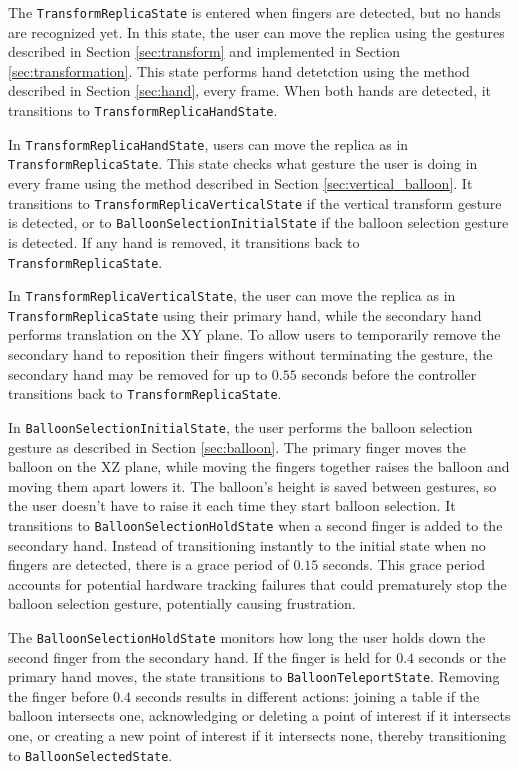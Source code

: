     The \lstinline{TransformReplicaState} is entered when fingers are detected, but no hands are recognized yet. In this state, the user can move the replica using the gestures described in Section \ref{sec:transform} and implemented in Section \ref{sec:transformation}. This state performs hand detetction using the method described in Section \ref{sec:hand}, every frame. When both hands are detected, it transitions to \lstinline{TransformReplicaHand}\lstinline{State}.
    
    In \lstinline{TransformReplicaHandState}, users can move the replica as in \lstinline{TransformReplica}\lstinline{State}. This state checks what gesture the user is doing in every frame using the method described in Section \ref{sec:vertical_balloon}. It transitions to \lstinline{TransformReplicaVerticalState} if the vertical transform gesture is detected, or to \lstinline{BalloonSelectionInitialState} if the balloon selection gesture is detected. If any hand is removed, it transitions back to \lstinline{TransformReplicaState}.

    In \lstinline{TransformReplicaVerticalState}, the user can move the replica as in \lstinline{TransformReplica}\lstinline{State} using their primary hand, while the secondary hand performs translation on the XY plane. To allow users to temporarily remove the secondary hand to reposition their fingers without terminating the gesture, the secondary hand may be removed for up to $0.55$ seconds before the controller transitions back to \lstinline{TransformReplicaState}.

    In \lstinline{BalloonSelectionInitialState}, the user performs the balloon selection gesture as described in Section \ref{sec:balloon}. The primary finger moves the balloon on the XZ plane, while moving the fingers together raises the balloon and moving them apart lowers it. The balloon's height is saved between gestures, so the user doesn't have to raise it each time they start balloon selection. It transitions to \lstinline{BalloonSelectionHoldState} when a second finger is added to the secondary hand. Instead of transitioning instantly to the initial state when no fingers are detected, there is a grace period of $0.15$ seconds. This grace period accounts for potential hardware tracking failures that could prematurely stop the balloon selection gesture, potentially causing frustration.

    The \lstinline{BalloonSelectionHoldState} monitors how long the user holds down the second finger from the secondary hand. If the finger is held for $0.4$ seconds or the primary hand moves, the state transitions to \lstinline{BalloonTeleportState}. Removing the finger before $0.4$ seconds results in different actions: joining a table if the balloon intersects one, acknowledging or deleting a point of interest if it intersects one, or creating a new point of interest if it intersects none, thereby transitioning to \lstinline{BalloonSelectedState}.

